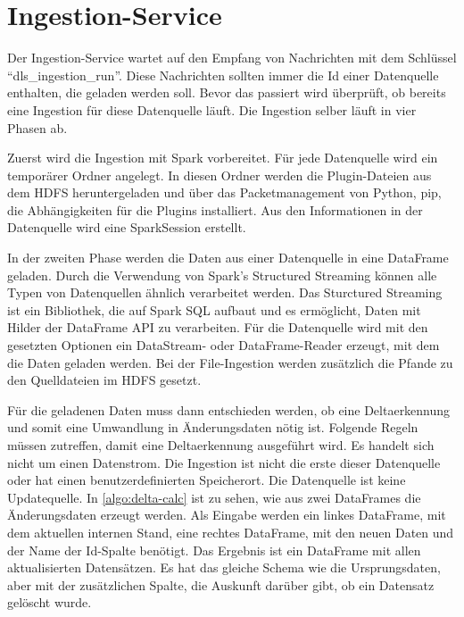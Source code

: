 \section{Ingestion-Service}

Der Ingestion-Service wartet auf den Empfang von Nachrichten mit dem Schlüssel "`dls\_ingestion\_run"'.
Diese Nachrichten sollten immer die Id einer Datenquelle enthalten, die geladen werden soll.
Bevor das passiert wird überprüft, ob bereits eine Ingestion für diese Datenquelle läuft.
Die Ingestion selber läuft in vier Phasen ab.

Zuerst wird die Ingestion mit Spark vorbereitet.
Für jede Datenquelle wird ein temporärer Ordner angelegt.
In diesen Ordner werden die Plugin-Dateien aus dem HDFS heruntergeladen und über das Packetmanagement von Python, pip, die Abhängigkeiten für die Plugins installiert.
Aus den Informationen in der Datenquelle wird eine SparkSession erstellt.

In der zweiten Phase werden die Daten aus einer Datenquelle in eine DataFrame geladen.
Durch die Verwendung von Spark's Structured Streaming können alle Typen von Datenquellen ähnlich verarbeitet werden.
Das Sturctured Streaming ist ein Bibliothek, die auf Spark SQL aufbaut und es ermöglicht, Daten mit Hilder der DataFrame API zu verarbeiten.
Für die Datenquelle wird mit den gesetzten Optionen ein DataStream- oder DataFrame-Reader erzeugt, mit dem die Daten geladen werden.
Bei der File-Ingestion werden zusätzlich die Pfande zu den Quelldateien im HDFS gesetzt.

Für die geladenen Daten muss dann entschieden werden, ob eine Deltaerkennung und somit eine Umwandlung in Änderungsdaten nötig ist.
Folgende Regeln müssen zutreffen, damit eine Deltaerkennung ausgeführt wird.
Es handelt sich nicht um einen Datenstrom.
Die Ingestion ist nicht die erste dieser Datenquelle oder hat einen benutzerdefinierten Speicherort.
Die Datenquelle ist keine Updatequelle.
In \cref{algo:delta-calc} ist zu sehen, wie aus zwei DataFrames die Änderungsdaten erzeugt werden.
Als Eingabe werden ein linkes DataFrame, mit dem aktuellen internen Stand, eine rechtes DataFrame, mit den neuen Daten und der Name der Id-Spalte benötigt.
Das Ergebnis ist ein DataFrame mit allen aktualisierten Datensätzen.
Es hat das gleiche Schema wie die Ursprungsdaten, aber mit der zusätzlichen Spalte, die Auskunft darüber gibt, ob ein Datensatz gelöscht wurde.

